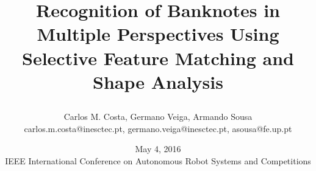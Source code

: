 





\title{\parbox{\linewidth}{\centering Recognition of Banknotes in Multiple Perspectives Using\\Selective Feature Matching and Shape Analysis}}
\author{Carlos M. Costa, Germano Veiga, Armando Sousa\texorpdfstring{\\{\LARGE \ttfamily carlos.m.costa@inesctec.pt, germano.veiga@inesctec.pt, asousa@fe.up.pt}}{}}
\date{May 4, 2016\\{IEEE International Conference on Autonomous Robot Systems and Competitions}}




\maketitle



\begin{columns}
	
	
	
	
	
\end{columns}


\endinput
